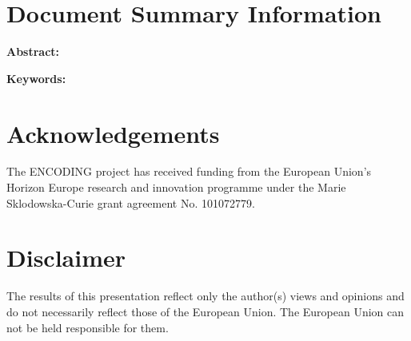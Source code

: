 \newpage

\section*{Document Summary Information}

\textbf{Abstract:} 

\MyAbstract
\newline

\textbf{Keywords:} \KeyWords
\newline



\vspace{1cm}


\newpage


\section*{Acknowledgements}
The ENCODING project has received funding from the European Union's Horizon Europe research and innovation programme under the Marie Sklodowska-Curie grant agreement No. 101072779.

\section*{Disclaimer}
The results of this presentation reflect only the author(s) views and opinions and do not necessarily reflect those of the European Union. The European Union can not be held responsible for them.

\newpage

\tableofcontents
\newpage

